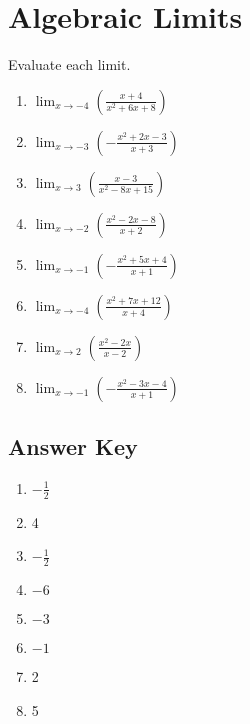 \chapter{Algebraic Limits}

Evaluate each limit.

\begin{enumerate}
	\item $\lim_{x \to -4} \left(\frac{x+4}{x^2+6x+8}\right)$
	\item $\lim_{x \to -3} \left(-\frac{x^2+2x-3}{x+3}\right)$
	\item $\lim_{x \to 3} \left(\frac{x-3}{x^2-8x+15}\right)$
	\item $\lim_{x \to -2} \left(\frac{x^2-2x-8}{x+2}\right)$
	\item $\lim_{x \to -1} \left(-\frac{x^2+5x+4}{x+1}\right)$
	\item $\lim_{x \to -4} \left(\frac{x^2+7x+12}{x+4}\right)$
	\item $\lim_{x \to 2} \left(\frac{x^2-2x}{x-2}\right)$
	\item $\lim_{x \to -1} \left(-\frac{x^2-3x-4}{x+1}\right)$
\end{enumerate}

\newpage

\section{Answer Key}

\begin{enumerate}
	\item $-\frac{1}{2}$
	\item 4
	\item $-\frac{1}{2}$
	\item $-6$
	\item $-3$
	\item $-1$
	\item 2
	\item 5
\end{enumerate}